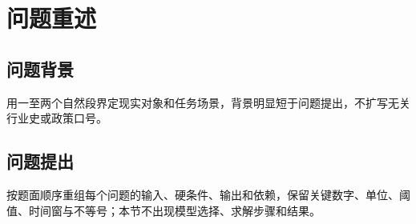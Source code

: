 \section{问题重述}

\subsection{问题背景}
用一至两个自然段界定现实对象和任务场景，背景明显短于问题提出，不扩写无关行业史或政策口号。

\subsection{问题提出}
按题面顺序重组每个问题的输入、硬条件、输出和依赖，保留关键数字、单位、阈值、时间窗与不等号；本节不出现模型选择、求解步骤和结果。
